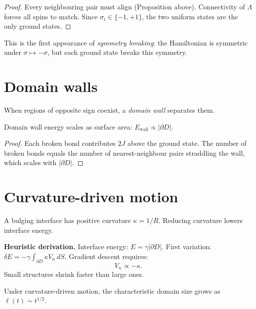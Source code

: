 \begin{proof}
  Every neighbouring pair must align (Proposition above).
  Connectivity of $\Lambda$ forces all spins to match.
  Since $\sigma_i \in \{-1,+1\}$, the two uniform states are
  the only ground states.
\end{proof}

This is the first appearance of \emph{symmetry breaking}: the
Hamiltonian is symmetric under $\sigma \mapsto -\sigma$, but
each ground state breaks this symmetry.

\section{Domain walls}

When regions of opposite sign coexist, a \emph{domain wall}
separates them.

\begin{proposition}
  \label{prop:wall-energy}
  Domain wall energy scales as surface area:
  $E_{\mathrm{wall}} \propto |\partial D|$.
\end{proposition}

\begin{proof}
  Each broken bond contributes $2J$ above the ground state.
  The number of broken bonds equals the number of
  nearest-neighbour pairs straddling the wall, which scales
  with $|\partial D|$.
\end{proof}


\section{Curvature-driven motion}

A bulging interface has positive curvature $\kappa = 1/R$.
Reducing curvature lowers interface energy.

\textbf{Heuristic derivation.}
Interface energy: $E = \gamma|\partial D|$.
First variation: $\delta E = -\gamma \int_{\partial D} \kappa V_n\, dS$.
Gradient descent requires:
\[
  \boxed{V_n \propto -\kappa.}
\]
Small structures shrink faster than large ones.

\begin{theorem}
  \label{thm:ising-scaling}
  Under curvature-driven motion, the characteristic domain
  size grows as $\ell(t) \sim t^{1/2}$.
\end{theorem}

